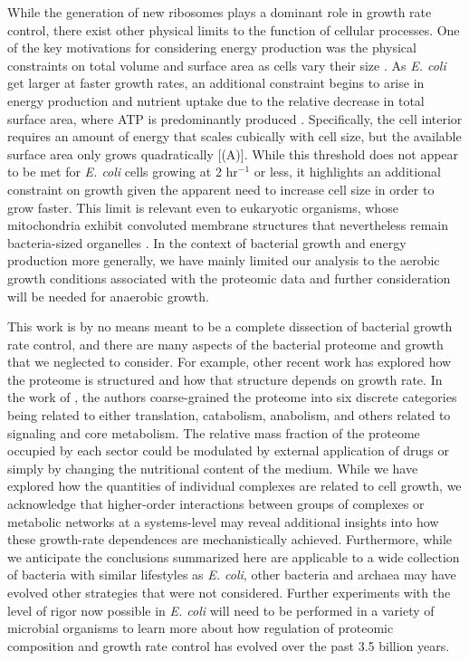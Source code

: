 While the generation of new ribosomes plays a dominant role in growth rate
control, there exist other physical limits to the function of cellular
processes. One of the key motivations for considering energy production was the
physical constraints on total volume and surface area as cells vary their size
\citep{harris2018, ojkic2019}. As \textit{E. coli} get larger at faster growth
rates, an additional constraint begins to arise in energy production and
nutrient uptake due to the relative decrease in total surface area, where ATP is
predominantly produced \citep{szenk2017}. Specifically, the cell interior
requires an amount of energy that scales cubically with cell size, but the
available surface area only grows quadratically [(A)]. While
this threshold does not appear to be met for \textit{E. coli} cells growing at 2
hr$^{-1}$ or less, it highlights an additional constraint on growth given the
apparent need to increase cell size in order to grow faster. This limit is
relevant even to eukaryotic organisms, whose mitochondria exhibit convoluted
membrane structures that nevertheless remain bacteria-sized organelles
\citep{guo2018}. In the context of bacterial growth and energy production more
generally, we have mainly limited our analysis to the aerobic growth conditions
associated with the proteomic data and further consideration will be needed for
anaerobic growth.

This work is by no means meant to be a complete dissection of bacterial
growth rate control, and there are many aspects of the bacterial proteome and
growth that we neglected to consider. For example, other recent work
\citep{liebermeister2014, hui2015, schmidt2016} has explored how the proteome is
structured and how that structure depends on growth rate. In the work of
\cite{hui2015}, the authors coarse-grained the proteome into six discrete
categories being related to either translation, catabolism, anabolism, and
others related to signaling and core metabolism. The relative mass fraction of
the proteome occupied by each sector could be modulated by external application
of drugs or simply by changing the nutritional content of the medium. While we
have explored how the quantities of individual complexes are related to cell
growth, we acknowledge that higher-order interactions between groups of
complexes or metabolic networks at a systems-level may reveal additional
insights into how these growth-rate dependences  are mechanistically achieved.
Furthermore, while we anticipate the conclusions summarized here are applicable
to a wide collection of bacteria with similar lifestyles as \textit{E. coli},
other bacteria and archaea may have evolved other strategies that were not
considered. Further experiments with the level of rigor now possible in
\textit{E. coli} will need to be performed in a variety of microbial organisms
to learn more about how regulation of proteomic composition and  growth rate
control has evolved over the past 3.5 billion years.
